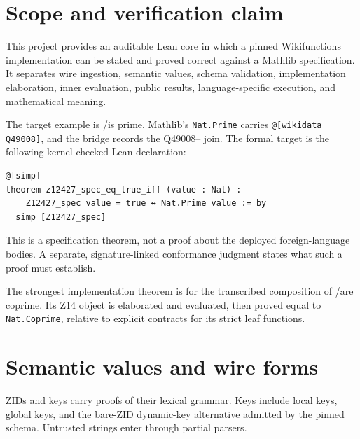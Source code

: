 
\chapter*{Scope and verification claim}

This project provides an auditable Lean core in which a pinned Wikifunctions implementation can
be stated and proved correct against a Mathlib specification.  It separates wire ingestion,
semantic values, schema validation, implementation elaboration, inner evaluation, public results,
language-specific execution, and mathematical meaning.

The target example is /is prime.  Mathlib's \texttt{Nat.Prime} carries
\texttt{@[wikidata Q49008]}, and the bridge records the Q49008-- join.  The formal
target is the following kernel-checked Lean declaration:
\begin{verbatim}
@[simp]
theorem z12427_spec_eq_true_iff (value : Nat) :
    Z12427_spec value = true ↔ Nat.Prime value := by
  simp [Z12427_spec]
\end{verbatim}
This is a specification theorem, not a proof about the deployed foreign-language bodies.  A
separate, signature-linked conformance judgment states what such a proof must establish.

The strongest implementation theorem is for the transcribed  composition of
/are coprime.  Its Z14 object is elaborated and evaluated, then proved equal to
\texttt{Nat.Coprime}, relative to explicit contracts for its strict leaf functions.

\chapter{Semantic values and wire forms}\label{ch:model}

\begin{definition}\label{def:identifiers}
  \leanok
  ZIDs and keys carry proofs of their lexical grammar.  Keys include local keys, global keys, and
  the bare-ZID dynamic-key alternative admitted by the pinned  schema.  Untrusted
  strings enter through partial parsers.
\end{definition}

